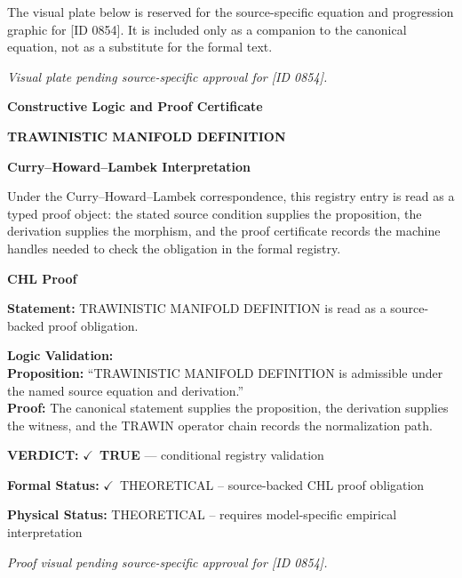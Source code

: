 \begingroup\footnotesize\sloppy
The visual plate below is reserved for the source-specific equation and progression graphic for [ID 0854]. It is included only as a companion to the canonical equation, not as a substitute for the formal text.
\par\endgroup
\begingroup\footnotesize\itshape
Visual plate pending source-specific approval for [ID 0854].
\par\endgroup

\clearpage
\begingroup\tzpsupportsetup
\noindent\textbf{\fontsize{10.8pt}{12.8pt}\selectfont [ID 0854] Constructive Logic and Proof Certificate}\par
\noindent\textbf{\fontsize{10pt}{12pt}\selectfont TRAWINISTIC MANIFOLD DEFINITION}\par
\vspace{0.45em}
\begingroup
\footnotesize
\setlength{\parskip}{0.22em}
\setlength{\parindent}{0pt}
\noindent\textbf{Curry--Howard--Lambek Interpretation}\par
Under the Curry--Howard--Lambek correspondence, this registry entry is read as a typed proof
object: the stated source condition supplies the proposition, the derivation supplies the
morphism, and the proof certificate records the machine handles needed to check the obligation
in the formal registry.

\vspace{0.45em}
\noindent\textbf{CHL Proof}\par
\textbf{Statement:} TRAWINISTIC MANIFOLD DEFINITION is read as a source-backed proof obligation.

\textbf{Logic Validation:}\\
\textbf{Proposition:} ``TRAWINISTIC MANIFOLD DEFINITION is admissible under the named source equation and derivation.''\\
\textbf{Proof:} The canonical statement supplies the proposition, the derivation supplies the witness, and the TRAWIN operator chain records the normalization path.

\textbf{VERDICT:} \ensuremath{\checkmark}\ \textbf{TRUE} --- conditional registry validation

\textbf{Formal Status:} \ensuremath{\checkmark}\ THEORETICAL -- source-backed CHL proof obligation

\textbf{Physical Status:} THEORETICAL -- requires model-specific empirical interpretation
\par\vspace{0.45em}
\par
\vfill
\begingroup\footnotesize\itshape
Proof visual pending source-specific approval for [ID 0854].
\par\endgroup
\vfill
\endgroup
\endgroup
